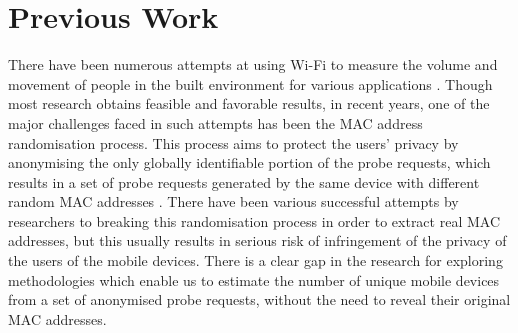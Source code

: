 \documentclass[11t, a4paper, twocolumn]{article}
\begin{document}
	\section{Previous Work}\label{prev}
		There have been numerous attempts at using Wi-Fi to measure the volume and movement of people in the built environment for various applications \citep{zarim2006,sap2015,reki2007}.
		Though most research obtains feasible and favorable results, in recent years, one of the major challenges faced in such attempts has been the MAC address randomisation process.
		This process aims to protect the users’ privacy by anonymising the only globally identifiable portion of the probe requests, which results in a set of probe requests generated by the same device with different random MAC addresses \citep{green2008}.
		There have been various successful attempts by researchers to breaking this randomisation process in order to extract real MAC addresses, \citep{martin2017} but this usually results in serious risk of infringement of the privacy of the users of the mobile devices.
		There is a clear gap in the research for exploring methodologies which enable us to estimate the number of unique mobile devices from a set of anonymised probe requests, without the need to reveal their original MAC addresses.
\end{document}
